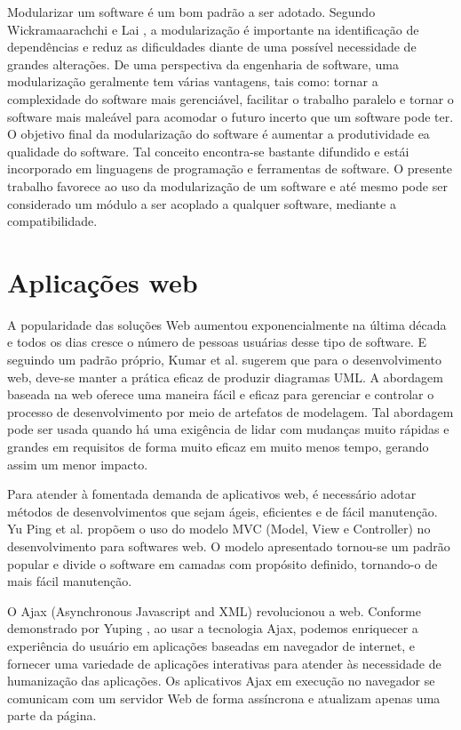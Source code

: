 Modularizar um software é um bom padrão a ser adotado. Segundo Wickramaarachchi e Lai \citep{7062705}, a modularização é importante na identificação de dependências e reduz as dificuldades diante de uma possível necessidade de grandes alterações. De uma perspectiva da engenharia de software, uma modularização geralmente tem várias vantagens, tais como: tornar a complexidade do software mais gerenciável, facilitar o trabalho paralelo e tornar o software mais maleável para acomodar o futuro incerto que um software pode ter. O objetivo final da modularização do software é aumentar a produtividade ea qualidade do software. Tal conceito encontra-se bastante difundido e estái incorporado em linguagens de programação e ferramentas de software. O presente trabalho favorece ao uso da modularização de um software e até mesmo pode ser considerado um módulo a ser acoplado a qualquer software, mediante a compatibilidade.


\section{Aplicações web}\label{sec:apps_web}


A popularidade das soluções Web aumentou exponencialmente na última década e todos os dias cresce o número de pessoas usuárias desse tipo de software. E seguindo um padrão próprio, Kumar et al. \citep{7813710} sugerem que para o desenvolvimento web, deve-se manter a prática eficaz de produzir diagramas UML. A abordagem baseada na web oferece uma maneira fácil e eficaz para gerenciar e controlar o processo de desenvolvimento por meio de artefatos de modelagem. Tal abordagem pode ser usada quando há uma exigência de lidar com mudanças muito rápidas e grandes em requisitos de forma muito eficaz em muito menos tempo, gerando assim um menor impacto. 


Para atender à fomentada demanda de aplicativos web, é necessário adotar métodos de desenvolvimentos que sejam ágeis, eficientes e de fácil manutenção. Yu Ping et al. \cite{1372143} propõem o uso do modelo MVC (Model, View e Controller) no desenvolvimento para softwares web. O modelo apresentado tornou-se um padrão popular e divide o software em camadas com propósito definido, tornando-o de mais fácil manutenção.


O Ajax (Asynchronous Javascript and XML) revolucionou a web. Conforme demonstrado por Yuping \citep{6845605}, ao usar a tecnologia Ajax, podemos enriquecer a experiência do usuário em aplicações baseadas em navegador de internet, e fornecer uma variedade de aplicações interativas para atender às necessidade de humanização das aplicações.
Os aplicativos Ajax em execução no navegador se comunicam com um servidor Web de forma assíncrona e atualizam apenas uma parte da página.


